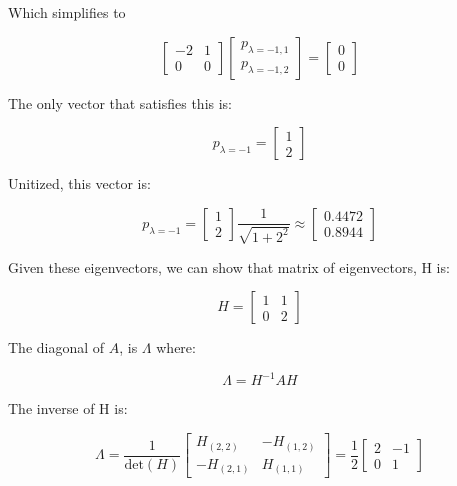 \documentclass[12pt, letterpaper]{../assignment}
\begin{document}
Which simplifies to

$$\left[\begin{array}{ccc} -2 & 1 \\ 0 & 0 \end{array}\right]
\left[\begin{array}{c} p_{\lambda=-1,1} \\ p_{\lambda=-1,2} \end{array}\right] =
\left[\begin{array}{c} 0 \\ 0 \end{array}\right]$$

The only vector that satisfies this is:

\begin{answer}
    $$ p_{\lambda=-1} = \left[\begin{array}{c} 1 \\ 2 \end{array}\right] $$
\end{answer}

Unitized, this vector is:

\begin{answer}
    $$ p_{\lambda=-1} = \left[\begin{array}{c} 1 \\ 2 \end{array}\right]\frac{1}{\sqrt{1+2^2}}
    \approx   \left[\begin{array}{c}  0.4472 \\ 0.8944 \end{array}\right] $$
\end{answer}

Given these eigenvectors, we can show that matrix of eigenvectors, H is:

$$ H = \left[\begin{array}{ccc} 1 & 1 \\ 0 & 2 \end{array}\right] $$

The diagonal of $A$, is $\Lambda$ where:

$$ \Lambda = H^{-1} A H $$

The inverse of H is:

$$ \Lambda = \frac{1}{\text{det}(H)} \left[\begin{array}{ccc} H_{(2,2)} & -H_{(1,2)} \\ -H_{(2,1)} & H_{(1,1)} \end{array}\right]
= \frac{1}{2} \left[\begin{array}{ccc} 2 & -1 \\ 0 & 1 \end{array}\right] $$
\end{document}

